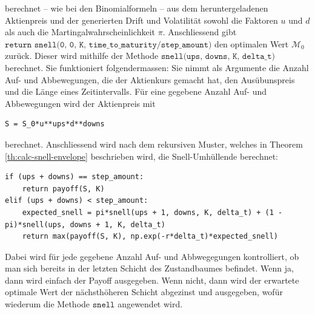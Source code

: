 \documentclass[11pt]{report} %
\begin{document}
berechnet -- wie bei den Binomialformeln -- aus dem heruntergeladenen Aktienpreis und der generierten Drift und Volatilität sowohl die Faktoren $u$ und $d$ als auch die Martingalwahrscheinlichkeit $\pi$. Anschliessend gibt $\texttt{return snell(0, 0, K, time\_to\_maturity/step\_amount)}$ den optimalen Wert $\mathcal{M}_0$ zurück. Dieser wird mithilfe der Methode $\texttt{snell(ups, downs, K, delta\_t)}$ berechnet. Sie funktioniert folgendermassen: Sie nimmt als Argumente die Anzahl Auf- und Abbewegungen, die der Aktienkurs gemacht hat, den Ausübunspreis und die Länge eines Zeitintervalls. Für eine gegebene Anzahl Auf- und Abbewegungen wird der Aktienpreis mit \begin{lstlisting}
S = S_0*u**ups*d**downs
\end{lstlisting} berechnet. Anschliessend wird nach dem rekursiven Muster, welches in Theorem \ref{th:calc-snell-envelope} beschrieben wird, die Snell-Umhüllende berechnet: \begin{lstlisting}
if (ups + downs) == step_amount:
    return payoff(S, K)
elif (ups + downs) < step_amount:
    expected_snell = pi*snell(ups + 1, downs, K, delta_t) + (1 - pi)*snell(ups, downs + 1, K, delta_t)
    return max(payoff(S, K), np.exp(-r*delta_t)*expected_snell)
\end{lstlisting}Dabei wird für jede gegebene Anzahl Auf- und Abbwegegungen kontrolliert, ob man sich bereits in der letzten Schicht des Zustandbaumes befindet. Wenn ja, dann wird einfach der Payoff ausgegeben. Wenn nicht, dann wird der erwartete optimale Wert der nächsthöheren Schicht abgezinst und ausgegeben, wofür wiederum die Methode $\texttt{snell}$ angewendet wird. 
\end{document}

